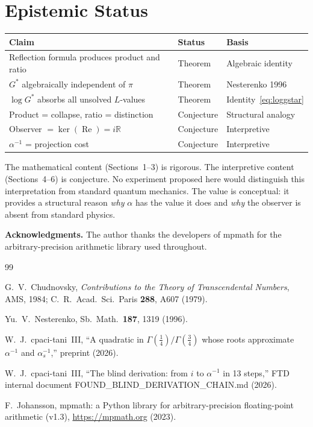\documentclass[12pt,reqno]{amsart}
\theoremstyle{definition}
\theoremstyle{remark}
\newcommand{\RR}{\mathbb{R}}
\newcommand{\Gstar}{G^{\!*}}
\newcommand{\re}{\operatorname{Re}}
\begin{document}
\section{Epistemic Status}

\begin{center}
\begin{tabular}{@{}lll@{}}
\toprule
Claim & Status & Basis \\
\midrule
Reflection formula produces product and ratio & Theorem & Algebraic identity \\
$\Gstar$ algebraically independent of $\pi$ & Theorem & Nesterenko 1996 \\
$\log\Gstar$ absorbs all unsolved $L$-values & Theorem & Identity~\eqref{eq:loggstar} \\
Product = collapse, ratio = distinction & Conjecture & Structural analogy \\
Observer $=\ker(\re)=i\RR$ & Conjecture & Interpretive \\
$\alpha^{-1}$ = projection cost & Conjecture & Interpretive \\
\bottomrule
\end{tabular}
\end{center}

\smallskip
The mathematical content (Sections~1--3) is rigorous. The interpretive content
(Sections~4--6) is conjecture. No experiment proposed here would distinguish this
interpretation from standard quantum mechanics. The value is conceptual: it provides
a structural reason \emph{why} $\alpha$ has the value it does and \emph{why} the
observer is absent from standard physics.

\bigskip
\noindent\textbf{Acknowledgments.}
The author thanks the developers of mpmath \cite{mpmath} for the arbitrary-precision
arithmetic library used throughout.

\begin{thebibliography}{99}

G.~V.~Chudnovsky,
\emph{Contributions to the Theory of Transcendental Numbers},
AMS, 1984;
C.~R.~Acad.~Sci.~Paris \textbf{288}, A607 (1979).

Yu.~V.~Nesterenko,
Sb.~Math.\ \textbf{187}, 1319 (1996).

W.~J.~cpaci-tani~III,
``A quadratic in $\Gamma(\tfrac14)/\Gamma(\tfrac34)$ whose roots approximate
$\alpha^{-1}$ and $\alpha_s^{-1}$,''
preprint (2026).

W.~J.~cpaci-tani~III,
``The blind derivation: from $i$ to $\alpha^{-1}$ in 13 steps,''
FTD internal document FOUND\_BLIND\_DERIVATION\_CHAIN.md (2026).

F.~Johansson,
mpmath: a Python library for arbitrary-precision floating-point arithmetic (v1.3),
\url{https://mpmath.org} (2023).

\end{thebibliography}
\end{document}
